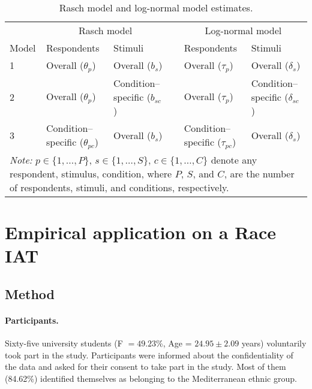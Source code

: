 \documentclass[12pt]{book}
\begin{document}
%
\begin{table}[h!]
	\centering\onehalfspacing
	\caption{Rasch model and log-normal model estimates.}
	\label{tab:paroverview} 
	\begin{tabularx}{\linewidth}{p{1.2cm} p{3cm} p{3cm} p{0.05cm} p{3cm} p{3cm}}
		\toprule
		&\multicolumn{2}{c}{Rasch model}
		& & 
		\multicolumn{2}{c}{Log-normal model}\\ 
		\cline{2-3}\cline{5-6} 
		Model & \multicolumn{1}{l}{Respondents} & \multicolumn{1}{l}{Stimuli} & & \multicolumn{1}{l}{Respondents} & \multicolumn{1}{l}{Stimuli} \\
		\midrule
		1 & Overall ($\theta_p$) & Overall ($b_s$) & & Overall  ($\tau_p$) & Overall ($\delta_s$) \\ 
		
		2 & Overall ($\theta_p$) & Condition--specific ($b_{sc}$) &  & Overall  ($\tau_p$)  & Condition--specific  ($\delta_{sc}$)  \\
		3 & Condition--specific ($\theta_{pc}$) & Overall ($b_s$) & & Condition--specific ($\tau_{pc}$)   & Overall  ($\delta_{s}$) \\
		\bottomrule
		\multicolumn{6}{p{\textwidth}}{\emph{Note:} $p \in \{1, \ldots, P\}$,  $s \in \{1,\ldots, S\}$, $c \in \{1,\ldots, C\}$  denote any respondent, stimulus, condition, where $P$, $S$, and $C$, are the number of respondents, stimuli, and conditions, respectively.}
	\end{tabularx}
\end{table} %

\section[Race IAT]{Empirical application on a Race IAT}\label{sec:rgm}

\subsection{Method}

\paragraph{Participants.}
Sixty-five university students (F $=49.23$\%, Age = $24.95\pm2.09$ years) voluntarily took part in the study. Participants were informed about the confidentiality of the data and asked for their consent to take part in the study. Most of them (84.62\%) identified themselves as belonging to the Mediterranean ethnic group.  
\end{document}
